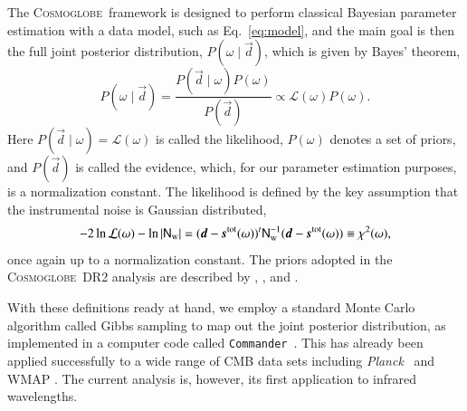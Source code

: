 \documentclass{aa}
\def\commander{\texttt{Commander}}
\def\Planck{\textit{Planck}}
\newcommand{\dv}[0]{\vec{d}}
\newcommand{\s}[0]{\vec{s}}
\newcommand{\N}[0]{\tens{N}}
\newcommand{\cosmoglobe}{\textsc{Cosmoglobe}}
\def\commander{\texttt{Commander}}
\def\Planck{\textit{Planck}}
\begin{document}
The \cosmoglobe\ framework is designed to perform classical Bayesian
parameter estimation with a data model, such as Eq.~\eqref{eq:model},
and the main goal is then the full joint posterior distribution,
$P(\omega\mid\dv)$, which is given by Bayes' theorem,
\begin{equation}
P(\omega\mid\dv) = \frac{P(\dv\mid\omega) P(\omega)}{P(\dv)} \propto
\mathcal{L}(\omega) P(\omega).
\end{equation}
Here $P(\dv\mid\omega) = \mathcal{L}(\omega)$ is called the likelihood,
$P(\omega)$ denotes a set of priors, and $P(\dv)$ is called the evidence,
which, for our parameter estimation purposes, is a 
normalization constant. The likelihood is defined by the key assumption that
the instrumental noise is Gaussian distributed,
\begin{equation}
-2\ln\mathcal{L}(\omega) -\ln|\mathsf N_\mathrm w|= (\dv-\s^{\mathrm{tot}}(\omega))^t
  \N_{\mathrm{w}}^{-1}(\dv-\s^{\mathrm{tot}}(\omega)) \equiv \chi^2(\omega),
\end{equation}
once again up to a normalization constant. The priors
adopted in the \cosmoglobe\ DR2 analysis are described by
\citet{CG02_01}, \citet{CG02_02}, and \citet{CG02_04}.

With these definitions ready at hand, we employ a standard Monte Carlo
algorithm called Gibbs sampling \citep[e.g.,][]{geman:1984} to map out
the joint posterior distribution, as implemented in a computer code
called \commander\ \citep{eriksen:2004,seljebotn:2019,bp03}. This has
already been applied successfully to a wide range of CMB data sets
including \Planck\ \citep{planck2014-a12,bp01} and WMAP
\citep{watts2023_dr1}. The current analysis is, however, its first
application to infrared wavelengths.
\end{document}
